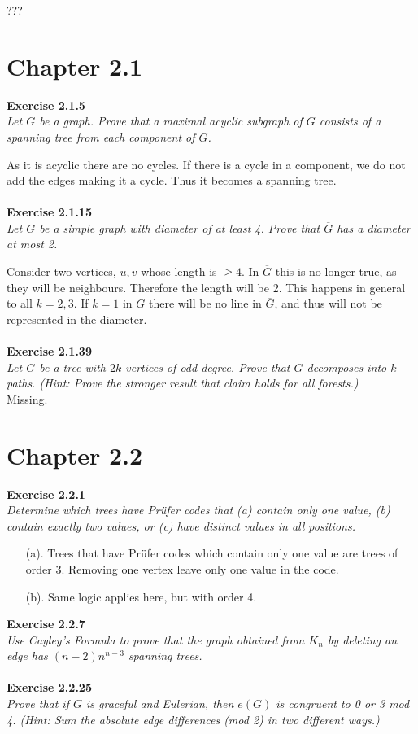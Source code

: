 ???



\section{Chapter 2.1}
\noindent
\textbf{Exercise 2.1.5}\\
\noindent
\textit{Let $G$ be a graph. Prove that a maximal acyclic subgraph of $G$ consists of a spanning tree from each component of $G$.}

As it is acyclic there are no cycles. If there is a cycle in a component, we do not add the edges making it a cycle. Thus it becomes a spanning tree.
\\\\
\noindent
\textbf{Exercise 2.1.15}\\
\noindent
\textit{Let $G$ be a simple graph with diameter of at least 4. Prove that $\overline{G}$ has a diameter at most 2.}

Consider two vertices, $u, v$ whose length is $\ge 4$. In $\overline{G}$ this is no longer true, as they will be neighbours. Therefore the length will be 2. This happens in general to all $k = 2, 3$. If $k = 1$ in $G$ there will be no line in $\overline{G}$, and thus will not be represented in the diameter.
\\\\
\noindent
\textbf{Exercise 2.1.39}\\
\noindent
\textit{Let $G$ be a tree with $2k$ vertices of odd degree. Prove that $G$ decomposes into $k$ paths. (Hint: Prove the stronger result that claim holds for all forests.)}\\
Missing.
\section{Chapter 2.2}
\noindent
\textbf{Exercise 2.2.1}\\
\noindent
\textit{Determine which trees have Prüfer codes that (a) contain only one value, (b) contain exactly two values, or (c) have distinct values in all positions.}\\

\begin{enumerate}
	\item[(a).] Trees that have Prüfer codes which contain only one value are trees of order 3. Removing one vertex leave only one value in the code.
	\item[(b).] Same logic applies here, but with order 4.
\end{enumerate}
\noindent
\textbf{Exercise 2.2.7}\\
\noindent
\textit{Use Cayley's Formula to prove that the graph obtained from $K_{n}$ by deleting an edge has $(n-2)n^{n-3}$ spanning trees.}
\\\\
\noindent
\textbf{Exercise 2.2.25}\\
\noindent
\textit{Prove that if $G$ is graceful and Eulerian, then $e(G)$ is congruent to 0 or 3 mod 4. (Hint: Sum the absolute edge differences (mod 2) in two different ways.)}
